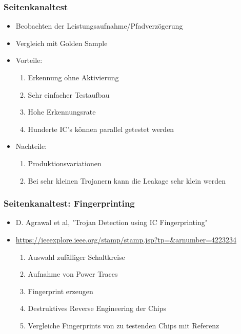 \documentclass[11pt]{beamer}
\begin{document}
\begin{frame}
    \frametitle{Seitenkanaltest}
    \begin{itemize}
        \item Beobachten der Leistungsaufnahme/Pfadverzögerung \item Vergleich mit Golden Sample
        \item Vorteile:
        \begin{enumerate}
            \item Erkennung ohne Aktivierung
            \item Sehr einfacher Testaufbau
            \item Hohe Erkennungsrate
            \item Hunderte IC's können parallel getestet werden
        \end{enumerate}
        \item Nachteile:
        \begin{enumerate}
            \item Produktionsvariationen
            \item Bei sehr kleinen Trojanern kann die Leakage sehr klein werden
        \end{enumerate}
    \end{itemize}
\end{frame}
\begin{frame}
    \frametitle{Seitenkanaltest: Fingerprinting}
    \begin{itemize}
        \item D. Agrawal et al, "Trojan Detection using IC Fingerprinting"
        \item \url{https://ieeexplore.ieee.org/stamp/stamp.jsp?tp=&arnumber=4223234}
        \begin{enumerate}
            \item Auswahl zufälliger Schaltkreise
            \item Aufnahme von Power Traces
            \item Fingerprint erzeugen
            \item Destruktives Reverse Engineering der Chips
            \item Vergleiche Fingerprints von zu testenden Chips mit Referenz
        \end{enumerate}
    \end{itemize}
\end{frame}
\end{document}
